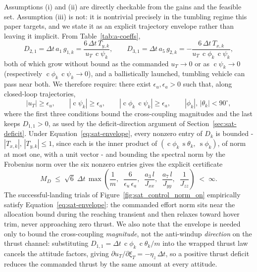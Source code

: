 \documentclass[conf]{new-aiaa}
\DeclareMathOperator{\s}{s}
\DeclareMathOperator{\cs}{c}
\begin{document}
Assumptions (i) and (ii) are directly checkable from the gains and the feasible set. Assumption (iii) is not: it is nontrivial precisely in the tumbling regime this paper targets, and we state it as an explicit trajectory envelope rather than leaving it implicit. From Table~\ref{tab:a-coeffs},
\begin{equation}
D_{2,1} = \Delta t\, a_1\, g_{1,k} = \frac{6\, \Delta t\, T_{y,k}}{u_T\, \cs\psi_k},
\qquad
D_{3,1} = \Delta t\, a_5\, g_{2,k} = -\frac{6\, \Delta t\, T_{x,k}}{u_T\, \cs\phi_k\, \cs\psi_k},
\end{equation}
both of which grow without bound as the commanded $u_T \to 0$ or as $\cs\psi_k \to 0$ (respectively $\cs\phi_k\, \cs\psi_k \to 0$), and a ballistically launched, tumbling vehicle can pass near both. We therefore require: there exist $\epsilon_u, \epsilon_a > 0$ such that, along closed-loop trajectories,
\begin{equation}
\label{eq:sat-envelope}
|u_T| \geq \epsilon_u,
\qquad
|\cs\psi_k| \geq \epsilon_a,
\qquad
|\cs\phi_k\, \cs\psi_k| \geq \epsilon_a,
\qquad
|\phi_k|,\, |\theta_k| < 90^{\circ},
\end{equation}
where the first three conditions bound the cross-coupling magnitudes and the last keeps $D_{1,1} > 0$, as used by the deficit-direction argument of Section~\ref{sec:sat-deficit}. Under Equation~\ref{eq:sat-envelope}, every nonzero entry of $D_k$ is bounded - $|T_{x,k}|,\, |T_{y,k}| \leq 1$, since each is the inner product of $(\cs\phi_k\, \s\theta_k,\ \s\phi_k)$, of norm at most one, with a unit vector - and bounding the spectral norm by the Frobenius norm over the six nonzero entries gives the explicit certificate
\begin{equation}
\label{eq:sat-MD-bound}
M_D \;\leq\; \sqrt{6}\; \Delta t\, \max\!\left( \frac{1}{m},\;\; \frac{6}{\epsilon_u\, \epsilon_a},\;\; \frac{a_3\, l}{J_{xx}},\;\; \frac{a_7\, l}{J_{yy}},\;\; \frac{1}{J_{zz}} \right) \;<\; \infty.
\end{equation}
The successful-landing trials of Figure~\ref{fig:sat_control_norm_on} empirically satisfy Equation~\ref{eq:sat-envelope}: the commanded effort norm sits near the allocation bound during the reaching transient and then relaxes toward hover trim, never approaching zero thrust. We also note that the envelope is needed only to bound the cross-coupling \emph{magnitude}, not the anti-windup \emph{direction} on the thrust channel: substituting $D_{1,1} = \Delta t\, \cs\phi_k\, \cs\theta_k / m$ into the wrapped thrust law cancels the attitude factors, giving $\partial u_T / \partial \xi_T = -\eta_z\, \Delta t$, so a positive thrust deficit reduces the commanded thrust by the same amount at every attitude.
\end{document}
